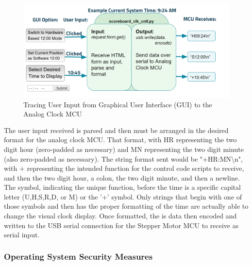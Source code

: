 \documentclass[11pt]{article}
\begin{document}
\begin{figure}[H]
\centering
\includegraphics[width=6.8in]{tracingGUIInput.PNG}
\caption{Tracing User Input from Graphical User Interface (GUI) to the Analog Clock MCU}
\label{UI_trace}
\end{figure}

The user input received is parsed and then must be arranged in the desired format for the analog clock MCU. That format, with HR representing the two digit hour (zero-padded as necessary) and MN representing the two digit minute (also zero-padded as necessary). 
The string format sent would be "+HR:MN\textbackslash{n}", with + representing the intended function for the control code scripts to receive, and then the two digit hour, a colon, the two digit minute, and then a newline. The symbol, indicating the unique function, before the time is a specific capital letter (U,H,S,R,D, or M) or the '+' symbol. Only strings that begin with one of those symbols and then has the proper formatting of the time are actually able to change the visual clock display. 
Once formatted, the is data then encoded and written to the USB serial connection for the Stepper Motor MCU to receive as serial input.



\subsubsection{Operating System Security Measures}
\label{SecurityDesign}

\end{document}
